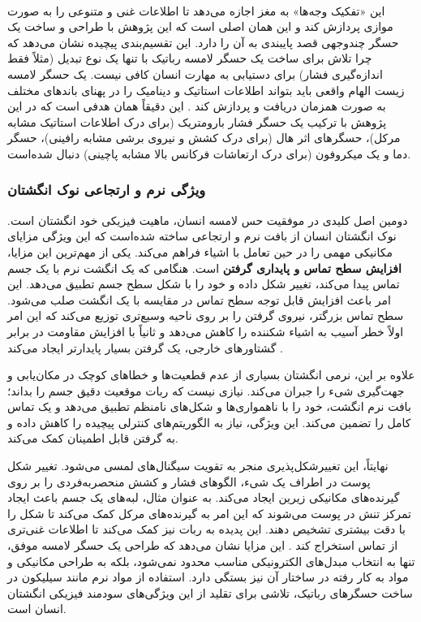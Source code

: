 \\
این «تفکیک وجه‌ها» به مغز اجازه می‌دهد تا اطلاعات غنی و متنوعی را به صورت موازی پردازش کند و این همان اصلی است که این پژوهش با طراحی و ساخت یک حسگر چندوجهی
قصد پایبندی به آن را دارد.
این تقسیم‌بندی پیچیده نشان می‌دهد که چرا تلاش برای ساخت یک حسگر لامسه رباتیک با تنها یک نوع تبدیل (مثلاً فقط اندازه‌گیری فشار) برای دستیابی به مهارت انسان کافی نیست. یک حسگر لامسه زیست الهام
 واقعی باید بتواند اطلاعات استاتیک و دینامیک را در پهنای باندهای مختلف به صورت همزمان دریافت و پردازش کند
 \cite{silvera2015artificial}.
  این دقیقاً همان هدفی است که در این پژوهش با ترکیب یک حسگر فشار بارومتریک (برای درک اطلاعات استاتیک مشابه مرکل)، حسگرهای اثر هال (برای درک کشش و نیروی برشی مشابه رافینی)، حسگر دما و یک میکروفون (برای درک ارتعاشات فرکانس بالا مشابه پاچینی) دنبال شده‌است.


\subsubsection{ویژگی نرم و ارتجاعی نوک انگشتان}

دومین اصل کلیدی در موفقیت حس لامسه انسان، ماهیت فیزیکی خود انگشتان است. نوک انگشتان انسان از بافت نرم و ارتجاعی ساخته شده‌است که این ویژگی مزایای مکانیکی مهمی را در حین تعامل با اشیاء فراهم می‌کند.
یکی از مهم‌ترین این مزایا، \textbf{افزایش سطح تماس و پایداری گرفتن} است. هنگامی که یک انگشت نرم با یک جسم تماس پیدا می‌کند، تغییر شکل داده و خود را با شکل سطح جسم تطبیق می‌دهد. این امر باعث افزایش قابل توجه سطح تماس در مقایسه با یک انگشت صلب می‌شود. سطح تماس بزرگتر، نیروی گرفتن را بر روی ناحیه وسیع‌تری توزیع می‌کند که این امر اولاً خطر آسیب به اشیاء شکننده را کاهش می‌دهد و ثانیاً با افزایش مقاومت در برابر گشتاورهای خارجی، یک گرفتن بسیار پایدارتر ایجاد می‌کند
 \cite{yousef2011tactile}.

علاوه بر این، نرمی انگشتان بسیاری از عدم قطعیت‌ها و خطاهای کوچک در مکان‌یابی و جهت‌گیری شیء را جبران می‌کند. نیازی نیست که ربات موقعیت دقیق جسم را بداند؛ بافت نرم انگشت، خود را با ناهمواری‌ها و شکل‌های نامنظم تطبیق می‌دهد و یک تماس کامل را تضمین می‌کند. این ویژگی، نیاز به الگوریتم‌های کنترلی پیچیده را کاهش داده و به گرفتن قابل اطمینان کمک می‌کند.

نهایتاً، این تغییرشکل‌پذیری منجر به تقویت سیگنال‌های لمسی می‌شود. تغییر شکل پوست در اطراف یک شیء، الگوهای فشار و کشش منحصربه‌فردی را بر روی گیرنده‌های مکانیکی زیرین ایجاد می‌کند. به عنوان مثال، لبه‌های یک جسم باعث ایجاد تمرکز تنش در پوست می‌شوند که این امر به گیرنده‌های مرکل کمک می‌کند تا شکل را با دقت بیشتری تشخیص دهند. این پدیده به ربات نیز کمک می‌کند تا اطلاعات غنی‌تری از تماس استخراج کند
\cite{silvera2015artificial}.
این مزایا نشان می‌دهد که طراحی یک حسگر لامسه موفق، تنها به انتخاب مبدل‌های الکترونیکی مناسب محدود نمی‌شود، بلکه به طراحی مکانیکی و مواد به کار رفته در ساختار آن نیز بستگی دارد. استفاده از مواد نرم مانند سیلیکون در ساخت حسگرهای رباتیک، تلاشی برای تقلید از این ویژگی‌های سودمند فیزیکی انگشتان انسان است.

